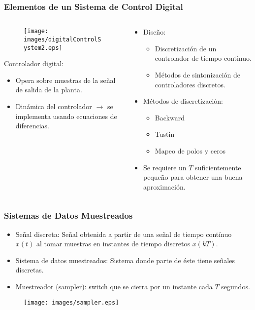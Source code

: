 \documentclass[aspectratio=169]{beamer}
\theoremstyle{definition}
\theoremstyle{plain}
\theoremstyle{remark}
\begin{document}
\begin{frame}[<+->]\frametitle{Elementos de un Sistema de Control Digital}
	\vspace*{-2mm}
	\begin{columns}
		\begin{column}{0.5\textwidth}
			\begin{figure}
				\centering
				\texttt{[image: images/digitalControlSystem2.eps]}
			\end{figure}
			Controlador digital:
			\begin{itemize}
				\item Opera sobre muestras de la señal de salida de la planta.
				\item Dinámica del controlador $\rightarrow$ se implementa usando ecuaciones de diferencias.
			\end{itemize}
		\end{column}
		\begin{column}{0.5\textwidth}
			\begin{itemize}
				\item Diseño:
				\begin{itemize}
					\item Discretización de un controlador de tiempo continuo.
					\item Métodos de sintonización de controladores discretos.
				\end{itemize}
				\item Métodos de discretización:
				\begin{itemize}
					\item Backward
					\item Tustin
					\item Mapeo de polos y ceros
				\end{itemize}
				\item Se requiere un $T$ suficientemente pequeño para obtener una buena aproximación.
			\end{itemize}
		\end{column}
	\end{columns}
\end{frame}

\begin{frame}[<+->]\frametitle{Sistemas de Datos Muestreados}
	\vspace*{3mm}
	\begin{itemize}
		\item Señal discreta: Señal obtenida a partir de una señal de tiempo contínuo $x(t)$ al tomar muestras en instantes de tiempo discretos $x(kT)$.
		\item Sistema de datos muestreados: Sistema donde parte de éste tiene señales discretas.
		\item Muestreador (sampler): switch que se cierra por un instante cada $T$ segundos.
	\end{itemize}
	\begin{figure}
		\centering
		\texttt{[image: images/sampler.eps]}
	\end{figure}
\end{frame}
\end{document}
